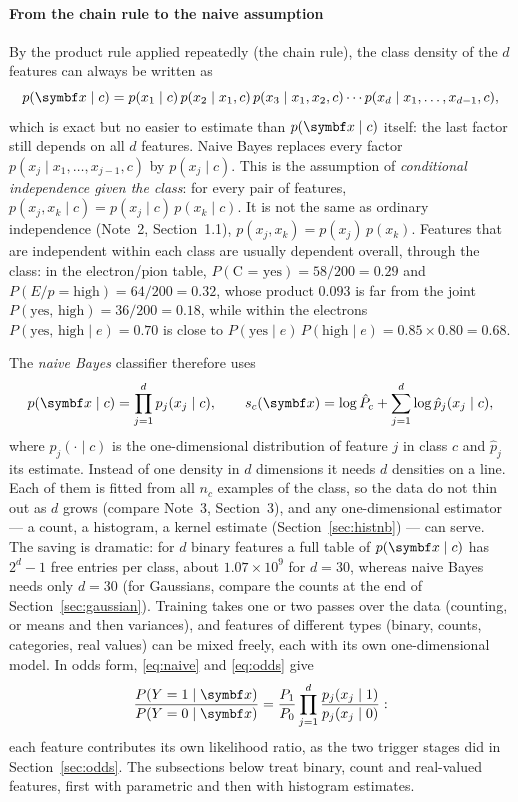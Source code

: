 \documentclass[11pt]{article}
\begin{document}
\paragraph{From the chain rule to the naive assumption} By the product rule applied repeatedly (the chain rule), the
class density of the $d$ features can always be written as
\[
  p(\x \mid c) = p(x_1 \mid c)\, p(x_2 \mid x_1, c)\, p(x_3 \mid x_1, x_2, c) \cdots p(x_d \mid x_1, \dots, x_{d-1}, c) ,
\]
which is exact but no easier to estimate than $p(\x \mid c)$ itself: the last factor still depends on all $d$
features. Naive Bayes replaces every factor $p(x_j \mid x_1, \dots, x_{j-1}, c)$ by $p(x_j \mid c)$. This is the
assumption of \emph{conditional independence given the class}: for every pair of features,
$p(x_j, x_k \mid c) = p(x_j \mid c)\, p(x_k \mid c)$. It is not the same as ordinary independence (Note~2,
Section~1.1), $p(x_j, x_k) = p(x_j)\, p(x_k)$. Features that are independent within each class are usually dependent overall, through the class: in the
electron/pion table, $P(\text{C = yes}) = 58/200 = 0.29$ and $P(E/p = \text{high}) = 64/200 = 0.32$, whose product
$0.093$ is far from the joint $P(\text{yes, high}) = 36/200 = 0.18$, while within the electrons
$P(\text{yes, high} \mid e) = 0.70$ is close to $P(\text{yes} \mid e)\, P(\text{high} \mid e) = 0.85 \times 0.80 = 0.68$.

The \emph{naive Bayes} classifier therefore uses
\begin{equation}\label{eq:naive}
  p(\x \mid c) = \prod_{j=1}^d p_j(x_j \mid c), \qquad
  s_c(\x) = \log \hat P_c + \sum_{j=1}^d \log \hat p_j(x_j \mid c) ,
\end{equation}
where $p_j(\cdot \mid c)$ is the one-dimensional distribution of feature $j$ in class $c$ and $\hat p_j$ its estimate.
Instead of one density in $d$ dimensions it needs $d$ densities on a line. Each of them is fitted from all $n_c$
examples of the class, so the data do not thin out as $d$ grows (compare Note~3, Section~3), and any one-dimensional
estimator --- a count, a histogram, a kernel estimate (Section~\ref{sec:histnb}) --- can serve. The saving is dramatic:
for $d$ binary features a full table of $p(\x \mid c)$ has $2^d - 1$ free entries per class, about $1.07 \times 10^9$
for $d = 30$, whereas naive Bayes needs only $d = 30$ (for Gaussians, compare the counts at the end of
Section~\ref{sec:gaussian}). Training takes one or two passes over the data (counting, or means and then variances), and
features of different types (binary, counts, categories, real values) can be mixed freely, each with its own
one-dimensional model. In odds form, \eqref{eq:naive} and \eqref{eq:odds} give
\[
  \frac{P(Y = 1 \mid \x)}{P(Y = 0 \mid \x)} = \frac{P_1}{P_0} \prod_{j=1}^d \frac{p_j(x_j \mid 1)}{p_j(x_j \mid 0)} :
\]
each feature contributes its own likelihood ratio, as the two trigger stages did in Section~\ref{sec:odds}. The
subsections below treat binary, count and real-valued features, first with parametric and then with histogram
estimates.
\end{document}
